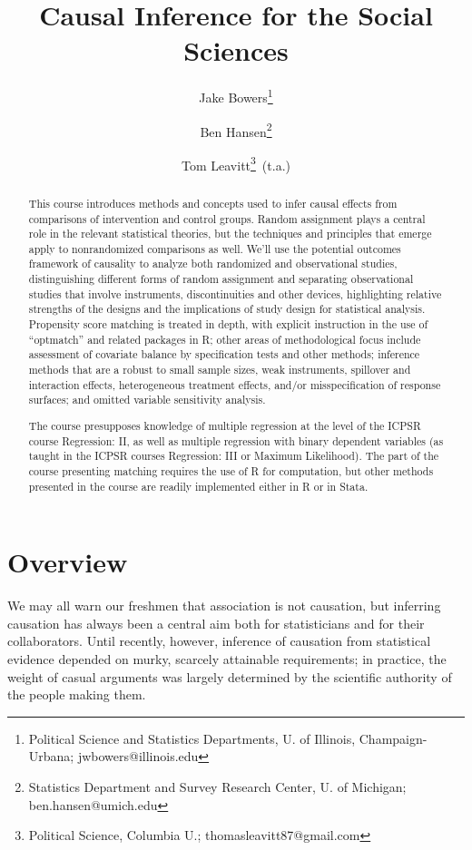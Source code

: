 \documentclass[12pt]{article}
\title{Causal Inference for the Social Sciences}
\author{ Jake Bowers\thanks{ Political Science and Statistics
    Departments, U. of Illinois, Champaign-Urbana; jwbowers@illinois.edu}
\and Ben Hansen\thanks{Statistics Department and Survey Research
  Center, U. of Michigan; ben.hansen@umich.edu} \and Tom
Leavitt\thanks{Political Science, Columbia U.; \mbox{thomasleavitt87@gmail.com}}\,  (t.a.)}
\begin{document}
\maketitle
\begin{abstract}
This course introduces methods and concepts used to infer causal
effects from comparisons of intervention and control groups.  Random
assignment plays a central role in the relevant statistical theories,
but the techniques and principles that emerge apply to nonrandomized
comparisons as well. We'll use the potential outcomes framework of
causality to analyze both randomized and observational studies,
distinguishing different forms of random assignment and separating
observational studies that involve instruments, discontinuities and
other devices, highlighting relative strengths of the designs and the
implications of study design for statistical analysis.  Propensity
score matching is treated in depth, with explicit instruction in the
use of ``optmatch'' and related packages in R; other areas of
methodological focus include assessment of covariate balance by
specification tests and other methods; inference methods that are a
robust to small sample sizes, weak instruments, spillover and interaction effects, heterogeneous treatment effects,
and/or misspecification of response surfaces; and omitted variable sensitivity
analysis.  %

The course presupposes knowledge of multiple regression at the level
of the ICPSR course Regression: II, as well as multiple regression
with binary dependent variables (as taught in the ICPSR courses
Regression: III or Maximum Likelihood).  The part of the course presenting
matching requires the use of R for computation, but other methods presented in
the course are readily implemented either in R or in Stata.
\end{abstract}




\clearpage

\nobibliography*


\section{Overview}
We may all warn our freshmen that association is not causation, but inferring causation has always been a central aim both for statisticians and for their collaborators. Until recently, however, inference of causation from statistical evidence depended on murky, scarcely attainable requirements; in practice, the weight of casual arguments was largely determined by the scientific authority of the people making them.
\end{document}
